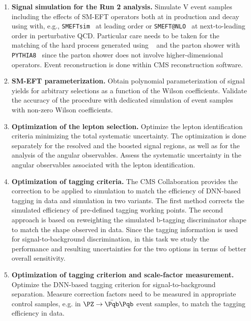 \documentclass[a4paper,11pt]{article}
\newcommand{\Pb}{{{\Pqb}}\xspace}
\renewcommand{\PV}{{{{V}}}\xspace}
\newcommand{\VH}{{{\PV}{\PH}}\xspace}
\begin{document}
\begin{enumerate}[noitemsep,topsep=0pt]
\item {\bf Signal simulation for the Run 2 analysis.} Simulate \VH event samples including the effects of SM-EFT operators both at in production and decay using with, e.g., \texttt{SMEFTsim}~\cite{Brivio:2020onw} at leading order or \texttt{SMEFT@NLO}~\cite{Degrande:2020evl} at next-to-leading order in perturbative QCD. 
Particular care needs to be taken for the matching of the hard process generated using \texttt{\MGvATNLO}~\cite{Alwall:2014hca} and the parton shower with \texttt{PYTHIA8}~\cite{Sjostrand:2014zea} 
since the parton shower does not involve higher-dimensional operators. Event reconstruction is done within CMS reconstruction software.

\item {\bf SM-EFT parameterization.} Obtain polynomial parameterization of signal yields for arbitrary selections as a function of the Wilson coefficients. Validate the accuracy of the procedure with dedicated simulation of event samples with non-zero Wilson coefficients.

\item {\bf Optimization of the lepton selection.} Optimize the lepton identification criteria  minimizing the total systematic uncertainty. The optimization is done separately for the resolved and the boosted signal regions, as well as for the analysis of the angular observables.
Assess the systematic uncertainty in the angular observables associated with the lepton identification.

\item {\bf Optimization of \Pb tagging criteria.} 
The CMS Collaboration provides the correction to be applied to simulation to match the efficiency of DNN-based \Pb tagging in data and simulation in two variants. 
The first method corrects the simulated efficiency of pre-defined  \Pb tagging working points. 
The second approach is based on reweighting the simulated b-tagging discriminator shape to match the shape observed in data.
Since the \Pb tagging information is used for signal-to-background discrimination, in this task we study the performance and resulting uncertainties for the two options in terms of better overall sensitivity.

\item {\bf Optimization of \PH tagging criterion and scale-factor measurement.} Optimize the DNN-based \PH tagging criterion for signal-to-background separation. 
Measure correction factors need to be measured in appropriate control samples, e.g. in $\PZ\rightarrow\bar \Pqb\Pqb$ event samples, to match the tagging efficiency in data.


\end{enumerate}
\end{document}
